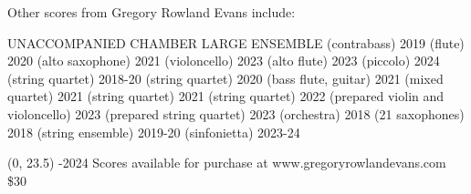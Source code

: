 \documentclass[11pt]{article}
\begin{document}

\begin{center}
\fontsize{.6cm}{1em}\selectfont Other scores from Gregory Rowland Evans include: \hfill
\end{center}
\vspace*{4\baselineskip}
{
\begin{center}
\setlength{\columnseprule}{1pt}
\setlength{\columnsep}{6em}

\begin{paracol}{3}
\fontsize{.3cm}{1em}\selectfont UNACCOMPANIED
\switchcolumn[1]
\fontsize{.3cm}{1em}\selectfont CHAMBER
\switchcolumn[2]
\fontsize{.3cm}{1em}\selectfont LARGE ENSEMBLE
\switchcolumn[0]
\fontsize{.1cm}{0.5em}  (contrabass) 2019
\switchcolumn[0]
\fontsize{.1cm}{0.5em}  (flute) 2020
\switchcolumn[0]
\fontsize{.1cm}{0.5em}  (alto saxophone) 2021
\switchcolumn[0]
\fontsize{.1cm}{0.5em}  (violoncello) 2023
\switchcolumn[0]
\fontsize{.1cm}{0.5em}  (alto flute) 2023
\switchcolumn[0]
\fontsize{.1cm}{0.5em}  (piccolo) 2024
\switchcolumn[1]
\fontsize{.1cm}{0.5em}  (string quartet) 2018-20
\switchcolumn[1]
\fontsize{.1cm}{0.5em}  (string quartet) 2020
\switchcolumn[1]
\fontsize{.1cm}{0.5em}  (bass flute, guitar) 2021
\switchcolumn[1]
\fontsize{.1cm}{0.5em}  (mixed quartet) 2021
\switchcolumn[1]
\fontsize{.1cm}{0.5em}  (string quartet) 2021
\switchcolumn[1]
\fontsize{.1cm}{0.5em}  (string quartet) 2022
\switchcolumn[1]
\fontsize{.1cm}{0.5em}  (prepared violin and violoncello) 2023
\switchcolumn[1]
\fontsize{.1cm}{0.5em}  (prepared string quartet) 2023
\switchcolumn[2]
\fontsize{.1cm}{0.5em}  (orchestra) 2018
\switchcolumn[2]
\fontsize{.1cm}{0.5em}  (21 saxophones) 2018
\switchcolumn[2]
\fontsize{.1cm}{0.5em}  (string ensemble) 2019-20
\switchcolumn[2]
\fontsize{.1cm}{0.5em}  (sinfonietta) 2023-24


\end{paracol}
\end{center}
}

\begin{textblock}{23}(0, 23.5)
-2024 \hfill
Scores available for purchase at www.gregoryrowlandevans.com \hfill
\$30
\end{textblock}
\end{document}
